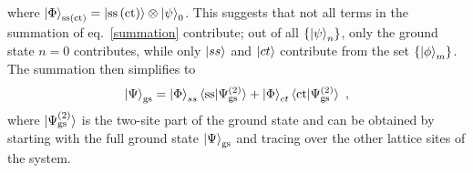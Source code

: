 where \(\ket{\Phi}_\text{ss(ct)} = \ket{\text{ss}\left( \text{ct} \right)}\otimes\ket{\psi}_0 \).
This suggests that not all terms in the summation of eq.~\eqref{summation} contribute; out of all \(\left\{ \ket{\psi}_n \right\} \), only the ground state \(n=0\) contributes, while only \(\ket{ss}\) and \(\ket{ct}\) contribute from the set \(\left\{ \ket{\phi}_m \right\} \). The summation then simplifies to
\begin{eqnarray}
	\label{gs-ss}
	\ket{\Psi}_\text{gs} = \ket{\Phi}_{ss}\braket{\text{ss}|\Psi^{(2)}_\text{gs}} + \ket{\Phi}_{ct}\braket{\text{ct}|\Psi^{(2)}_\text{gs}}~,
\end{eqnarray}
where \(\ket{\Psi^{(2)}_\text{gs}}\) is the two-site part of the ground state and can be obtained by starting with the full ground state \(\ket{\Psi}_\text{gs}\) and tracing over the other lattice sites of the system.

